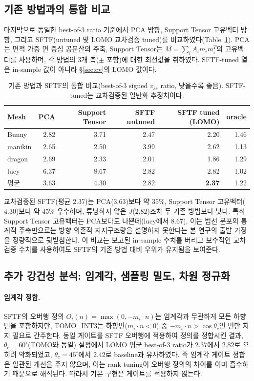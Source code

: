 \documentclass[11pt,a4paper]{article}
\begin{document}
\subsection{기존 방법과의 통합 비교}
\label{sec:baseline}

마지막으로 동일한 best-of-3 ratio 기준에서 PCA 방향, Support Tensor 고유벡터 방향,
그리고 SFTF(untuned 및 LOMO 교차검증 tuned)를 비교하였다(Table~\ref{tab:unified}).
PCA%
는 면적 가중 면 중심 공분산의 주축, Support Tensor는 $M=\sum_i A_i m_i m_i^T$의 고유벡터를 사용하며,
각 방법의 3개 축($\pm$ 포함)에 대한 최선값을 취하였다.
SFTF-tuned 열은 in-sample 값이 아니라 \S\ref{sec:cv}의 LOMO 값이다.

\begin{table}[H]
\centering
\caption{기존 방법과 SFTF의 통합 비교(best-of-3 signed $v_{ss}$ ratio, 낮을수록 좋음).
SFTF-tuned는 교차검증된 일반화 추정치이다.}
\label{tab:unified}
\begin{tabular}{lrrrrr}
\toprule
Mesh & PCA & Support Tensor & SFTF untuned & SFTF tuned (LOMO) & oracle\\
\midrule
Bunny    & 2.82 & 3.71 & 2.47 & 2.20 & 1.46\\
manikin  & 2.65 & 2.50 & 3.99 & 2.62 & 1.13\\
dragon   & 2.69 & 2.33 & 2.01 & 1.86 & 1.29\\
lucy     & 6.37 & 8.67 & 2.82 & 2.82 & 1.02\\
\midrule
평균     & 3.63 & 4.30 & 2.82 & \textbf{2.37} & 1.22\\
\bottomrule
\end{tabular}
\end{table}

교차검증된 SFTF(평균 $2.37$)는 PCA($3.63$)보다 약 $35\%$, Support Tensor 고유벡터($4.30$)보다 약 $45\%$ 우수하며,
튜닝하지 않은 $J$($2.82$)조차 두 기존 방법보다 낫다.
특히 Support Tensor 고유벡터는 PCA보다도 나쁜데(lucy에서 $8.67$),
이는 법선 분포의 통계적 주축만으로는 방향 의존적 지지구조량을 설명하지 못한다는
본 연구의 출발 가정을 정량적으로 뒷받침한다.
이 비교는 보고된 in-sample 수치를 버리고 보수적인 교차검증 수치를 사용하여도
SFTF의 기존 방법 대비 우위가 유지됨을 보여준다.

\subsection{추가 강건성 분석: 임계각, 샘플링 밀도, 차원 정규화}
\label{sec:robustness}

\paragraph{임계각 정합.}
SFTF의 오버행 정의 $O_i(n)=\max(0,-m_i\cdot n)$는 임계각과 무관하게 모든 하향면을 포함하지만,
TOMO\_INT3는 하향면($m_i\cdot n<0$) 중 $-m_i\cdot n>\cos\theta_c$인 면만 지지 필요로 간주한다.
동일 게이트를 SFTF 오버행에 적용하여 정의를 정합시킨 결과,
$\theta_c=60^\circ$(TOMO와 동일) 설정에서 LOMO 평균 best-of-3 ratio가
$2.37$에서 $2.82$로 오히려 악화되었고, $\theta_c=45^\circ$에서 $2.42$로 baseline과 유사하였다.
즉 임계각 게이트 정합은 일관된 개선을 주지 않으며,
이는 rank tuning이 오버행 정의의 차이를 이미 흡수하기 때문으로 해석된다.
따라서 기본 구현은 게이트를 적용하지 않는다.
\end{document}

